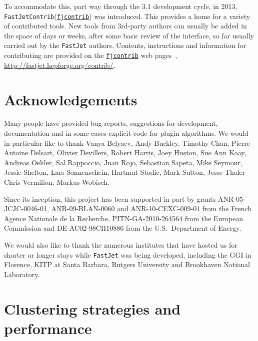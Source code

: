 \documentclass[12pt,a4]{article}
\newcommand{\fastjet}{\texttt{FastJet}\xspace}
\newcommand{\contrib}{\texttt{Contrib}\xspace}
\newcommand{\fjcontrib}{\texttt{\href{http://fastjet.hepforge.org/contrib/}{fjcontrib}}\xspace}
\begin{document}
To accommodate this, part way through the 3.1 development cycle, in
2013, \fastjet \contrib (\fjcontrib) was introduced. 
%
This provides a home for a variety of contributed tools. 
%
New tools from 3rd-party authors can usually be added in the space of
days or weeks, after some basic review of the interface, so far
usually carried out by the \fastjet authors.
%
Contents, instructions and information for contributing are provided
on the \fjcontrib web pages~\cite{fjcontrib},
\url{http://fastjet.hepforge.org/contrib/}.
%



\section*{Acknowledgements}

Many people have provided bug reports, suggestions for development,
documentation and in some cases explicit code for plugin
algorithms. We would in particular like to thank
%
%
Vanya Belyaev,
Andy Buckley,
Timothy Chan,
Pierre-Antoine Delsart,
Olivier Devillers,
Robert Harris,
Joey Huston,
Sue Ann Koay,
Andreas Oehler,
Sal Rappoccio,
Juan Rojo,
Sebastian Sapeta,
Mike Seymour,
Jessie Shelton,
Lars Sonnenschein,
Hartmut Stadie,
Mark Sutton,
Jesse Thaler
Chris Vermilion,
Markus Wobisch.

Since its inception, this project has been supported in part by grants
ANR-05-JCJC-0046-01, ANR-09-BLAN-0060 and ANR-10-CEXC-009-01 from the
French Agence Nationale de la Recherche, PITN-GA-2010-264564 from the
European Commission and DE-AC02-98CH10886 from the U.S.\ Department of
Energy.

We would also like to thank the numerous institutes that have hosted
us for shorter or longer stays while \fastjet was being developed,
including the GGI in Florence, KITP at Santa Barbara, Rutgers
University and Brookhaven National Laboratory.
\appendix

\section{Clustering strategies and performance}
\label{app:strategies}
\end{document}
